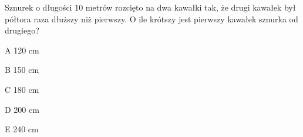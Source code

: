 \begin{tresc}
Sznurek o długości 10 metrów rozcięto na dwa kawałki tak, że drugi kawałek był półtora raza dłuższy niż pierwszy. O ile krótszy jest pierwszy kawałek sznurka od drugiego?
\end{tresc}
\begin{wariant}{A} 120 cm \end{wariant}
\begin{wariant}{B} 150 cm \end{wariant}
\begin{wariant}{C} 180 cm \end{wariant}
\begin{wariant}{D} 200 cm \end{wariant}
\begin{wariant}{E} 240 cm \end{wariant}
